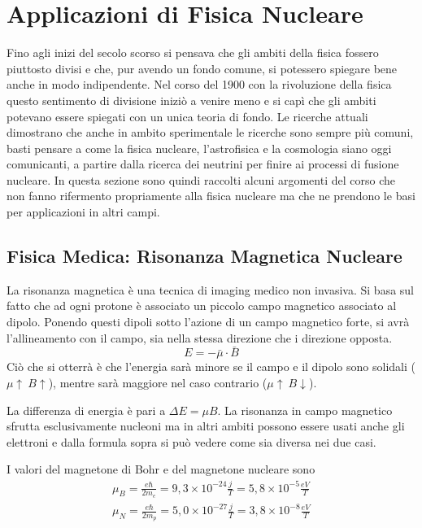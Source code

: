 
\section{Applicazioni di Fisica Nucleare}

Fino agli inizi del secolo scorso si pensava che gli ambiti della fisica fossero piuttosto divisi e che, pur avendo un fondo comune, si potessero spiegare bene anche in modo indipendente.
Nel corso del 1900 con la rivoluzione della fisica questo sentimento di divisione iniziò a venire meno e si capì che gli ambiti potevano essere spiegati con un unica teoria di fondo.
Le ricerche attuali dimostrano che anche in ambito sperimentale le ricerche sono sempre più comuni, basti pensare a come la fisica nucleare, l'astrofisica e la cosmologia siano oggi comunicanti, a partire dalla ricerca dei neutrini per finire ai processi di fusione nucleare.
In questa sezione sono quindi raccolti alcuni argomenti del corso che non fanno rifermento propriamente alla fisica nucleare ma che ne prendono le basi per applicazioni in altri campi.

\subsection{Fisica Medica: Risonanza Magnetica Nucleare}
La risonanza magnetica è una tecnica di imaging medico non invasiva.
Si basa sul fatto che ad ogni protone è associato un piccolo campo magnetico associato al dipolo. 
Ponendo questi dipoli sotto l'azione di un campo magnetico forte, si avrà l'allineamento con il campo, sia nella stessa direzione che i direzione opposta.
\begin{equation}
E=-\bar \mu\cdot \bar B
\end{equation}
Ciò che si otterrà è che l'energia sarà minore se il campo e il dipolo sono solidali ($\mu\uparrow\  B\uparrow$), mentre sarà maggiore nel caso contrario ($\mu\uparrow\  B\downarrow$).
\begin{figure}

\end{figure}
La differenza di energia è pari a $\Delta E=\mu B$.
La risonanza in campo magnetico sfrutta esclusivamente nucleoni ma in altri ambiti possono essere usati anche gli elettroni e dalla formula sopra si può vedere come sia diversa nei due casi.

I valori del magnetone di Bohr e del magnetone nucleare sono 
\begin{equation}
\begin{split}
\mu_B=\frac{e\hbar}{2m_e}=9,3\times10^{-24}\frac{j}{T}=5,8\times10^{-5}\frac{eV}{T}\\
\mu_N=\frac{e\hbar}{2m_p}=5,0\times10^{-27}\frac{j}{T}=3,8\times10^{-8}\frac{eV}{T}
\end{split}
\end{equation}

